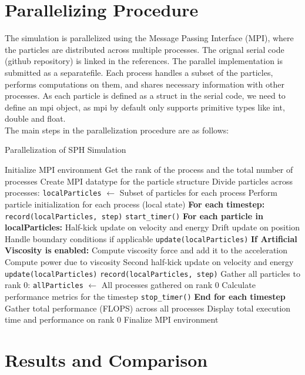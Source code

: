 \documentclass[11pt]{article}
\begin{document}
\section{Parallelizing Procedure}
The simulation is parallelized using the Message Passing Interface (MPI), where the particles are distributed across multiple processes. The orignal serial code (github repository) is linked in the references. The parallel implementation is submitted as a separatefile.
Each process handles a
subset of the particles, performs computations on them, and shares necessary information with other processes. As each particle is defined as a struct in the serial code, we need to define an mpi object, as mpi by default only supports primitive types like int, double and float.
\\
The main steps in the parallelization procedure are as follows:
\begin{algorithm}[H]
\caption{Parallelization of SPH Simulation}
\begin{algorithmic}[1]
\STATE Initialize MPI environment
\STATE Get the rank of the process and the total number of processes
\STATE Create MPI datatype for the particle structure
\STATE Divide particles across processes:
\STATE \quad \texttt{localParticles} $\leftarrow$ Subset of particles for each process
\STATE Perform particle initialization for each process (local state)
\STATE \textbf{For each timestep:}
\STATE \quad \texttt{record(localParticles, step)} 
\STATE \quad \texttt{start\_timer()} 
\STATE \quad \textbf{For each particle in localParticles:}
\STATE \quad \quad Half-kick update on velocity and energy
\STATE \quad \quad Drift update on position
\STATE \quad \quad Handle boundary conditions if applicable
\STATE \quad \quad \texttt{update(localParticles)} 
\STATE \quad \quad \textbf{If Artificial Viscosity is enabled:}
\STATE \quad \quad \quad Compute viscosity force and add it to the acceleration
\STATE \quad \quad \quad Compute power due to viscosity
\STATE \quad \quad Second half-kick update on velocity and energy
\STATE \quad \texttt{update(localParticles)} 
\STATE \quad \texttt{record(localParticles, step)} 
\STATE \quad Gather all particles to rank 0:
\STATE \quad \quad \texttt{allParticles} $\leftarrow$ All processes gathered on rank 0
\STATE \quad Calculate performance metrics for the timestep
\STATE \quad \texttt{stop\_timer()} 
\STATE \textbf{End for each timestep}
\STATE Gather total performance (FLOPS) across all processes
\STATE Display total execution time and performance on rank 0
\STATE Finalize MPI environment
\end{algorithmic}
\end{algorithm}

\section{Results and Comparison}
\end{document}
